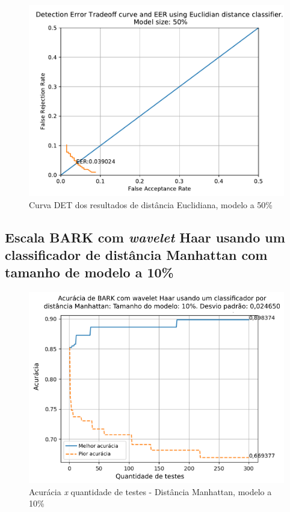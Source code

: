 			\begin{figure}[!h]
				\centering
				\includegraphics[width=.6\linewidth]{images/results/det/DET_for_classifier_Euclidian_50}
				\caption{Curva DET dos resultados de distância Euclidiana, modelo a 50\%}
				\label{fig:detforclassifiereuclidian50}
			\end{figure}
		
			\FloatBarrier
		\subsection{Escala BARK com \textit{wavelet} Haar usando um classificador de distância Manhattan com tamanho de modelo a 10\%}
		
			
	
			\begin{figure}[ht]
				\centering
				\includegraphics[width=.6\linewidth]{images/results/confusionMatrices/classifier_Manhattan_10.png}
				\caption{Acurácia \textit{x} quantidade de testes - Distância Manhattan, modelo a 10\%}
				\label{fig:classifiermanhattan10}
			\end{figure}
		

